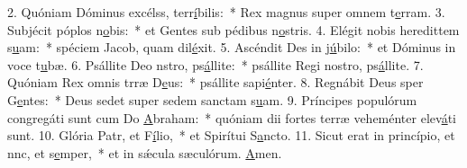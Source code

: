 2. Quóniam Dóminus excélss, terr\uline{í}bilis:~* Rex magnus super omnem t\uline{e}rram.
3. Subjécit póplos n\uline{o}bis:~* et Gentes sub pédibus n\uline{o}stris.
4. Elégit nobis heredittem s\uline{u}am:~* spéciem Jacob, quam dil\uline{é}xit.
5. Ascéndit Des in j\uline{ú}bilo:~* et Dóminus in voce t\uline{u}bæ.
6. Psállite Deo nstro, ps\uline{á}llite:~* psállite Regi nostro, ps\uline{á}llite.
7. Quóniam Rex omnis trræ D\uline{e}us:~* psállite sapi\uline{é}nter.
8. Regnábit Deus sper G\uline{e}ntes:~* Deus sedet super sedem sanctam s\uline{u}am.
9. Príncipes populórum congregáti sunt cum Do \uline{A}braham:~* quóniam dii fortes terræ veheménter elev\uline{á}ti sunt.
10. Glória Patr, et F\uline{í}lio,~* et Spirítui S\uline{a}ncto.
11. Sicut erat in princípio, et nnc, et s\uline{e}mper,~* et in sǽcula sæculórum. \uline{A}men.
